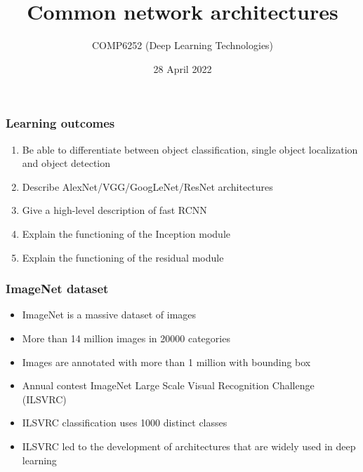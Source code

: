 \documentclass{beamer}
\begin{document}
\title{Common network architectures}
\author{COMP6252 (Deep Learning Technologies)}
 \date{28 April 2022}
 \date{}
\begin{frame}
    \placelogofalse %
    \titlepage
\end{frame}
    
\placelogotrue
\begin{frame}
	\frametitle{Learning outcomes}
\begin{enumerate}
	\item Be able to differentiate between object classification, single object localization and object detection

	\item Describe AlexNet/VGG/GoogLeNet/ResNet architectures
	\item Give a high-level description of fast RCNN
	\item Explain the functioning of the Inception module
	\item Explain the functioning of the residual module
\end{enumerate}
	

\end{frame}
\begin{frame}
    \frametitle{ImageNet dataset}
\begin{itemize}
    \item ImageNet is a massive dataset of images
    \item More than 14 million images in 20000 categories 
    \item Images are annotated with more than 1 million with bounding box
    \item Annual contest ImageNet Large Scale Visual Recognition Challenge (ILSVRC)
    \item ILSVRC classification uses  1000 distinct classes
    \item ILSVRC led to the development of architectures that are widely used in deep learning
\end{itemize}
    
\end{frame}
\end{document}
